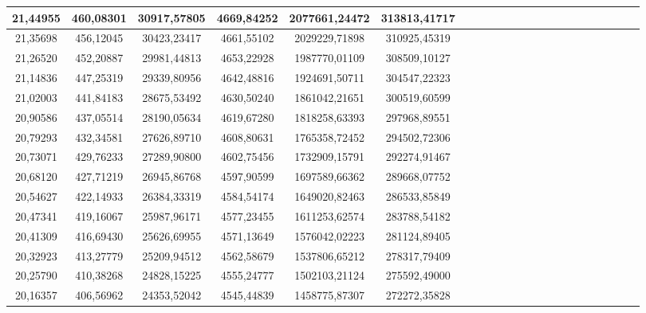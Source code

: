 \documentclass[10pt,a4paper]{article}
\begin{document}
\begin{center}
\begin{table}[h!]
\begin{tabular}{|c|c|c|c|c|c|c|c|c|c|c|c|c|c|c|c|c|c|c|c|c|c|}
21,44955 & 460,08301                & 30917,57805                 & 4669,84252                  & 2077661,24472 & 313813,41717 \\ \hline
21,35698 & 456,12045                & 30423,23417                 & 4661,55102                  & 2029229,71898 & 310925,45319 \\ \hline
21,26520 & 452,20887                & 29981,44813                 & 4653,22928                  & 1987770,01109 & 308509,10127 \\ \hline
21,14836 & 447,25319                & 29339,80956                 & 4642,48816                  & 1924691,50711 & 304547,22323 \\ \hline
21,02003 & 441,84183                & 28675,53492                 & 4630,50240                  & 1861042,21651 & 300519,60599 \\ \hline
20,90586 & 437,05514                & 28190,05634                 & 4619,67280                  & 1818258,63393 & 297968,89551 \\ \hline
20,79293 & 432,34581                & 27626,89710                 & 4608,80631                  & 1765358,72452 & 294502,72306 \\ \hline
20,73071 & 429,76233                & 27289,90800                 & 4602,75456                  & 1732909,15791 & 292274,91467 \\ \hline
20,68120 & 427,71219                & 26945,86768                 & 4597,90599                  & 1697589,66362 & 289668,07752 \\ \hline
20,54627 & 422,14933                & 26384,33319                 & 4584,54174                  & 1649020,82463 & 286533,85849 \\ \hline
20,47341 & 419,16067                & 25987,96171                 & 4577,23455                  & 1611253,62574 & 283788,54182 \\ \hline
20,41309 & 416,69430                & 25626,69955                 & 4571,13649                  & 1576042,02223 & 281124,89405 \\ \hline
20,32923 & 413,27779                & 25209,94512                 & 4562,58679                  & 1537806,65212 & 278317,79409 \\ \hline
20,25790 & 410,38268                & 24828,15225                 & 4555,24777                  & 1502103,21124 & 275592,49000 \\ \hline
20,16357 & 406,56962                & 24353,52042                 & 4545,44839                  & 1458775,87307 & 272272,35828 \\ \hline

\end{tabular}
\end{table}
\end{center}
\end{document}

